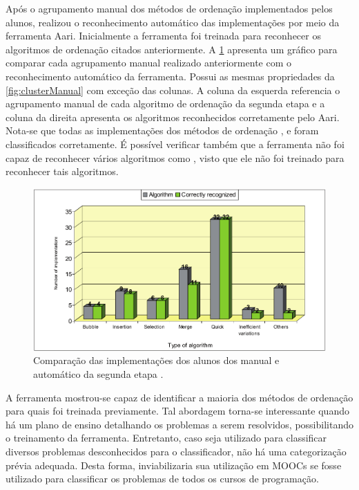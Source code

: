 	    Após o agrupamento manual dos métodos de ordenação implementados pelos alunos,
	     realizou o reconhecimento automático das
	    implementações por meio da ferramenta Aari. Inicialmente a ferramenta foi
	    treinada para reconhecer os algoritmos de ordenação citados anteriormente.
	    A \cref{fig:clusterAutomatico} apresenta um gráfico para comparar cada
	    agrupamento manual realizado anteriormente com o reconhecimento automático
	    da ferramenta. Possui as mesmas propriedades da \cref{fig:clusterManual}
	    com exceção das colunas. A coluna da esquerda referencia o agrupamento manual
	    de cada algoritmo de ordenação da segunda etapa e a coluna da direita apresenta
	    os algoritmos reconhecidos corretamente pelo Aari. Nota-se que todas as
	    implementações dos métodos de ordenação ,
	     e  foram classificados corretamente.
	    É possível verificar também que a ferramenta não foi capaz de reconhecer vários
	    algoritmos como , visto que ele não foi treinado para
	    reconhecer tais algoritmos.
	    
	    \begin{figure}[ht]
	        \centering
	        \includegraphics[scale=0.33]{imagem/clusterAutomatico.png}
	        \captionsetup{justification=centering}
	        \caption[Comparação das implementações dos alunos dos 
	        manual e automático da segunda etapa]{Comparação das implementações dos
	        alunos dos  manual e automático da segunda etapa \cite{Taherkhani:2012}.}
	        \label{fig:clusterAutomatico}
	    \end{figure}
	    
	    A ferramenta mostrou-se capaz de identificar a maioria dos métodos de ordenação
	    para quais foi treinada previamente. Tal abordagem torna-se interessante quando
	    há um plano de ensino detalhando os problemas a serem resolvidos, possibilitando
	    o treinamento da ferramenta. Entretanto, caso seja utilizado para classificar
	    diversos problemas desconhecidos para o classificador, não há uma categorização
	    prévia adequada. Desta forma, inviabilizaria sua utilização em MOOCs se fosse
	    utilizado para classificar os problemas de todos os cursos de programação.
	    
